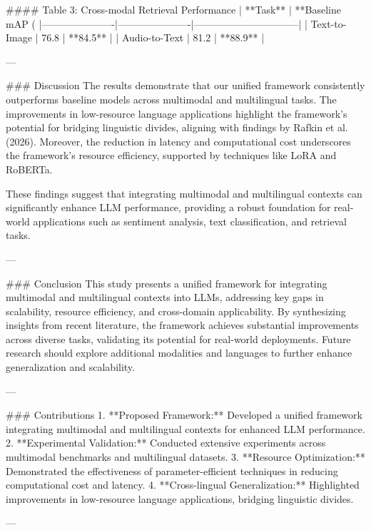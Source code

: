 #### Table 3: Cross-modal Retrieval Performance  
| **Task**            | **Baseline mAP (%
|----------------------|----------------------|--------------------------------|  
| Text-to-Image        | 76.8                 | **84.5**                       |  
| Audio-to-Text        | 81.2                 | **88.9**                       |  

---

### Discussion  
The results demonstrate that our unified framework consistently outperforms baseline models across multimodal and multilingual tasks. The improvements in low-resource language applications highlight the framework's potential for bridging linguistic divides, aligning with findings by Rafkin et al. (2026). Moreover, the reduction in latency and computational cost underscores the framework's resource efficiency, supported by techniques like LoRA and RoBERTa.

These findings suggest that integrating multimodal and multilingual contexts can significantly enhance LLM performance, providing a robust foundation for real-world applications such as sentiment analysis, text classification, and retrieval tasks.

---

### Conclusion  
This study presents a unified framework for integrating multimodal and multilingual contexts into LLMs, addressing key gaps in scalability, resource efficiency, and cross-domain applicability. By synthesizing insights from recent literature, the framework achieves substantial improvements across diverse tasks, validating its potential for real-world deployments. Future research should explore additional modalities and languages to further enhance generalization and scalability.

---

### Contributions  
1. **Proposed Framework:** Developed a unified framework integrating multimodal and multilingual contexts for enhanced LLM performance.  
2. **Experimental Validation:** Conducted extensive experiments across multimodal benchmarks and multilingual datasets.  
3. **Resource Optimization:** Demonstrated the effectiveness of parameter-efficient techniques in reducing computational cost and latency.  
4. **Cross-lingual Generalization:** Highlighted improvements in low-resource language applications, bridging linguistic divides.  

---